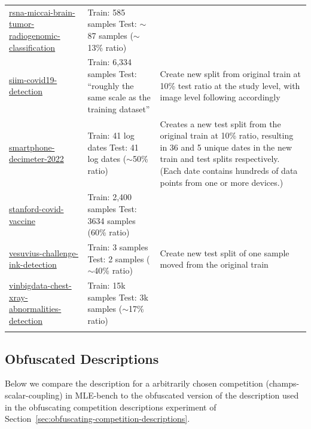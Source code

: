 \documentclass{article} %
\begin{document}
\begin{longtable}{m{4cm} m{4.5cm} m{4cm}}
    \href{https://www.kaggle.com/c/rsna-miccai-brain-tumor-radiogenomic-classification}{rsna-miccai-brain-tumor-radiogenomic-classification} &  Train: 585 samples \newline  Test: $\sim$87 samples ($\sim$13\% ratio) & \\
    \href{https://www.kaggle.com/c/siim-covid19-detection}{siim-covid19-detection} &  Train: 6,334 samples \newline  Test: ``roughly the same scale as the training dataset'' & Create new split from original train at 10\% test ratio at the study level, with image level following accordingly \\
    \href{https://www.kaggle.com/c/smartphone-decimeter-2022}{smartphone-decimeter-2022} &  Train: 41 log dates \newline  Test: 41 log dates ($\sim$50\% ratio) & Creates a new test split from the original train at 10\% ratio, resulting in 36 and 5 unique dates in the new train and test splits respectively. (Each date contains hundreds of data points from one or more devices.)\\
    \href{https://www.kaggle.com/c/stanford-covid-vaccine}{stanford-covid-vaccine} &  Train: 2,400 samples \newline  Test: 3634 samples (60\% ratio) & \\
    \href{https://www.kaggle.com/c/vesuvius-challenge-ink-detection}{vesuvius-challenge-ink-detection} &  Train: 3 samples \newline  Test: 2 samples ($\sim$40\% ratio) & Create new test split of one sample moved from the original train \\
    \href{https://www.kaggle.com/c/vinbigdata-chest-xray-abnormalities-detection}{vinbigdata-chest-xray-abnormalities-detection} &  Train: 15k samples \newline  Test: 3k samples ($\sim$17\% ratio) & \\
\label{tab:dataset_splits}
\end{longtable}

\subsection{Obfuscated Descriptions}\label{app:obfuscated-descriptions}

Below we compare the description for a arbitrarily chosen competition (champs-scalar-coupling) in MLE-bench to the obfuscated version of the description used in the obfuscating competition descriptions experiment of Section~\ref{sec:obfuscating-competition-descriptions}.
\end{document}

